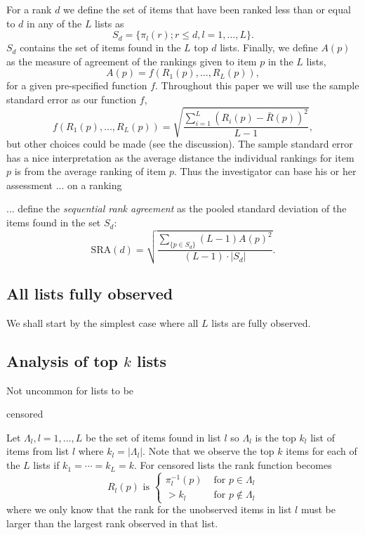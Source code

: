 \documentclass[12pt,a4paper]{article}\usepackage[]{graphicx}\usepackage[]{color}
\begin{document}
For a rank $d$ we define the set of items that have been ranked less than or equal to $d$ in any of the $L$ lists as
\begin{equation}
S_d = \{\pi_l(r) ; r \leq d, l = 1, \ldots, L \}.
\end{equation}
$S_d$ contains the set of items found in the $L$ top $d$ lists.
Finally, we define $A(p)$ as the measure of agreement of the rankings given to item $p$ in the $L$ lists,
\begin{equation}
A(p) = f(R_1(p), \ldots, R_L(p)),
\end{equation}
for a given pre-specified function $f$. Throughout this paper we will use the sample standard error as our function $f$,
$$f(R_1(p), \ldots, R_L(p)) = \sqrt{\frac{\sum_{i=1}^L (R_i(p) - \bar{R}(p))^2}{L-1}},
$$
but other choices could be made (see the discussion). The sample standard error has a nice interpretation as the average distance the individual rankings for item $p$ is from the average ranking of item $p$. Thus the investigator can base his or her assessment  ... on a ranking


... define the \emph{sequential rank agreement} as the pooled standard deviation of the items found in the set $S_d$:
\begin{equation}
\textrm{SRA}(d)= \sqrt{\frac{\sum_{\{p \in S_d\}}(L-1)A(p)^2}{(L-1)\cdot|S_d|}}.
\end{equation}

\subsection{All lists fully observed}
We shall start by the simplest case where all $L$ lists are fully observed. 

\subsection{Analysis of top $k$ lists}
Not uncommon for lists to be 


censored


Let $\Lambda_l, l=1, \ldots, L$ be the set of items found in list $l$ so $\Lambda_l$ is the top $k_l$ list of items from list $l$ where $k_l = |\Lambda_l|$. Note that we observe the top $k$ items for each of the $L$ lists if $k_1=\cdots=k_L=k$. For censored lists the rank function becomes
\begin{equation}
R_l(p) \text{ is } \left\{\begin{array}{cl} \pi_l^{-1}(p) & \text{ for } p\in \Lambda_l \\ 
> k_l & \text{ for } p \not\in \Lambda_l\end{array}\right.
\end{equation}
where we only know that the rank for the unobserved items in list $l$ must be larger than the largest rank observed in that list.
\end{document}
